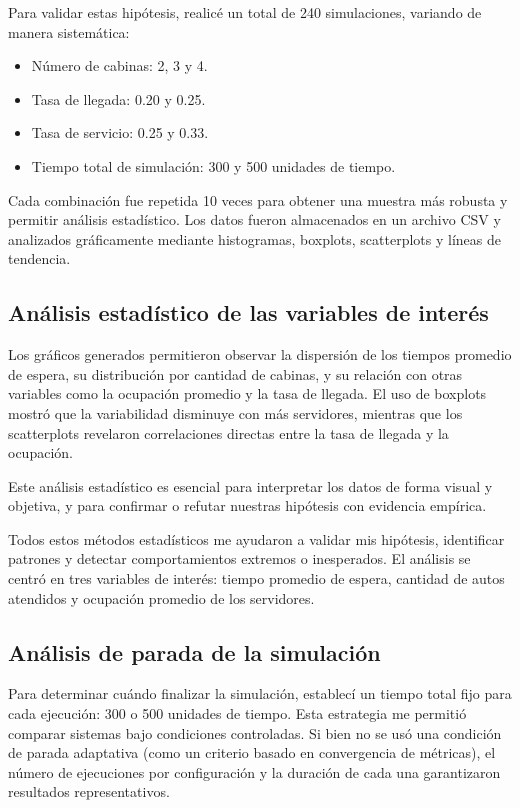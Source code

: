 \documentclass[12pt]{article}
\begin{document}
    Para validar estas hipótesis, realicé un total de 240 simulaciones, variando de manera sistemática:
    
    \begin{itemize}
      \item Número de cabinas: 2, 3 y 4.
      \item Tasa de llegada: 0.20 y 0.25.
      \item Tasa de servicio: 0.25 y 0.33.
      \item Tiempo total de simulación: 300 y 500 unidades de tiempo.
    \end{itemize}
    
    Cada combinación fue repetida 10 veces para obtener una muestra más robusta y permitir análisis estadístico. Los datos fueron almacenados en un archivo CSV y analizados gráficamente mediante histogramas, boxplots, scatterplots y líneas de tendencia.
    
    \subsection*{Análisis estadístico de las variables de interés}
    
    Los gráficos generados permitieron observar la dispersión de los tiempos promedio de espera, su distribución por cantidad de cabinas, y su relación con otras variables como la ocupación promedio y la tasa de llegada. El uso de boxplots mostró que la variabilidad disminuye con más servidores, mientras que los scatterplots revelaron correlaciones directas entre la tasa de llegada y la ocupación.
    
    Este análisis estadístico es esencial para interpretar los datos de forma visual y objetiva, y para confirmar o refutar nuestras hipótesis con evidencia empírica.
    
    Todos estos métodos estadísticos me ayudaron a validar mis hipótesis, identificar patrones y detectar comportamientos extremos o inesperados. El análisis se centró en tres variables de interés: tiempo promedio de espera, cantidad de autos atendidos y ocupación promedio de los servidores.

    \subsection*{Análisis de parada de la simulación}
    
    Para determinar cuándo finalizar la simulación, establecí un tiempo total fijo para cada ejecución: 300 o 500 unidades de tiempo. Esta estrategia me permitió comparar sistemas bajo condiciones controladas. Si bien no se usó una condición de parada adaptativa (como un criterio basado en convergencia de métricas), el número de ejecuciones por configuración y la duración de cada una garantizaron resultados representativos.
\end{document}
